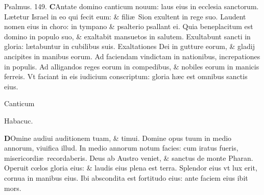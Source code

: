 \documentclass[a5paper,10pt]{book}
\def\rightmarginnote{%
	\lrmarginnote{\hskip\columnwidth \hskip -1em}}
\def\ae{æ}
\def\oe{œ}
\begin{document}
\begin{multicols*}{2}
\newline \color{red} Psalmus. \hypertarget{ps149}{149.} \color{black}
\lettrine[lines=2]{\bfseries \color{red} C}{}Antate domino canticum nouum: laus eius in ecclesia sanctorum.
\newline \color{red} L\color{black}\ae tetur Israel in eo qui fecit eum: \& fili\ae \ Sion exultent in rege suo. %
\newline \color{red} L\color{black}audent nomen eius in choro: in tympano \& psalterio psallant ei.
\newline \color{red} Q\color{black}uia beneplacitum est domino in populo suo, \& exaltabit mansuetos in salutem.
\newline \color{red} E\color{black}xultabunt sancti in gloria: l\ae tabuntur in cubilibus suis.
\newline \color{red} E\color{black}xaltationes Dei in gutture eorum, \& gladij ancipites in manibus eorum.
\newline \color{red} A\color{black}d faciendam vindictam in nationibus, increpationes in populis.
\newline \color{red} A\color{black}d alligandos reges eorum in compedibus, \& nobiles eorum in manicis ferreis.
\newline \color{red} V\color{black}t faciant in eis iudicium conscriptum: gloria h\ae c est omnibus sanctis eius.
\vspace{-1em}
\begin{center} \color{red}
\hypertarget{Habakkuk}{Canticum} Habacuc.
\end{center}
\vspace{-1em}
\lettrine[lines=2]{\bfseries \color{red} D}{}Omine\rightmarginnote{Haba.\\3.} audiui auditionem tuam, \& timui.
\newline \color{red} D\color{black}omine opus tuum in medio annorum, viuifica illud.
\newline \color{red} I\color{black}n medio annorum notum facies: cum iratus fueris, misericordi\ae \ recordaberis.
\newline \color{red} D\color{black}eus ab Austro veniet, \& sanctus de monte Pharan.
\newline \color{red} O\color{black}peruit c\oe los gloria eius: \& laudis eius plena est terra.
\newline \color{red} S\color{black}plendor eius vt lux erit, cornua in manibus eius.
\newline \color{red} I\color{black}bi abscondita est fortitudo eius: ante faciem eius ibit mors.

\end{multicols*}
\end{document}
